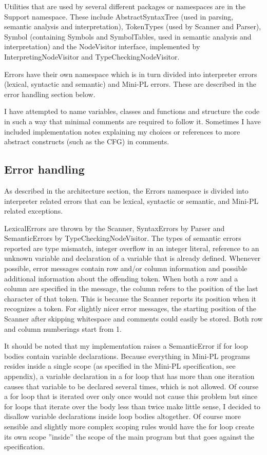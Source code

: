 \documentclass[a4paper,11pt]{article}
\begin{document}
Utilities that are used by several different packages or namespaces are in the Support namespace. These include AbstractSyntaxTree (used in parsing, semantic analysis and interpretation), TokenTypes (used by Scanner and Parser), Symbol (containing Symbols and SymbolTables, used in semantic analysis and interpretation) and the NodeVisitor interface, implemented by InterpretingNodeVisitor and TypeCheckingNodeVisitor.

Errors have their own namespace which is in turn divided into interpreter errors (lexical, syntactic and semantic) and Mini-PL errors. These are described in the error handling section below.

I have attempted to name variables, classes and functions and structure the code in such a way that minimal comments are required to follow it. Sometimes I have included implementation notes explaining my choices or references to more abstract constructs (such as the CFG) in comments.

\subsection{Error handling}

As described in the architecture section, the Errors namespace is divided into interpreter related errors that can be lexical, syntactic or semantic, and Mini-PL related exceptions.

LexicalErrors are thrown by the Scanner, SyntaxErrors by Parser and SemanticErrors by TypeCheckingNodeVisitor. The types of semantic errors reported are type mismatch, integer overflow in an integer literal, reference to an unknown variable and declaration of a variable that is already defined. Whenever possible, error messages contain row and/or column information and possible additional information about the offending token. When both a row and a column are specified in the message, the column refers to the position of the last character of that token. This is because the Scanner reports its position when it recognizes a token. For slightly nicer error messages, the starting position of the Scanner after skipping whitespace and comments could easily be stored. Both row and column numberings start from 1.

It should be noted that my implementation raises a SemanticError if for loop bodies contain variable declarations. Because everything in Mini-PL programs resides inside a single scope (as specified in the Mini-PL specification, see appendix), a variable declaration in a for loop that has more than one iteration causes that variable to be declared several times, which is not allowed. Of course a for loop that is iterated over only once would not cause this problem but since for loops that iterate over the body less than twice make little sense, I decided to disallow variable declarations inside loop bodies altogether. Of course more sensible and slightly more complex scoping rules would have the for loop create its own scope ''inside'' the scope of the main program but that goes against the specification.
\end{document}
